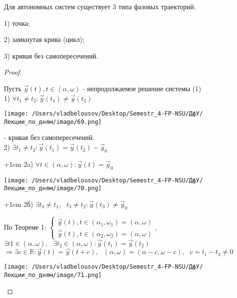 \documentclass[12pt, a4paper]{report}
\begin{document}
\begin{theorem} 
    Для автономных систем существует 3 типа фазовых траекторий: 

    1) точка; 

    2) замкнутая крива (цикл); 

    3) кривая без самопересечений.

\end{theorem}

\begin{proof} \(  \) 

    Пусть \( \vec{y } (t ) , t \in (\alpha , \omega ) \) - непродолжаемое решение системы (1) \\

    1) \( \forall  t_1 \neq  t_2 : \vec{ y} (t_1 ) \neq  \vec{ y} (t_2 ) \) 

    \begin{center}
        \texttt{[image: /Users/vladbelousov/Desktop/Semestr\_4-FP-NSU/ДфУ/Лекции\_по\_дням/image/69.png]}
    \end{center}
    - кривая без самопересечений. \\

    2) \( \exists  t_1 \neq  t_2 : \vec{ y } (t_1 ) = \vec{ y } (t_2 ) - \vec{ y}_0 \) 

    \kern+1cm 2a) \( \forall  t  \in  (\alpha , \omega ) : \vec{ y }  (t ) = \vec{ y} _0 \) 

    \begin{center}
        \texttt{[image: /Users/vladbelousov/Desktop/Semestr\_4-FP-NSU/ДфУ/Лекции\_по\_дням/image/70.png]}
    \end{center}

    \kern+1cm 2б) \( \exists  t_3 \neq  t_1 , \text{  } t_3 \neq  t_2 : \vec{ y}  (t_3 ) \neq  \vec{ y} _0 \) 

    По Теореме 1: \( \begin{cases}
    \vec{ y}  (t ) , t \in (\alpha_1 , \omega_1 ) = (\alpha , \omega ) \\
    \vec{y } (t ) , t \in  (\alpha_2 , \omega_2 ) = (\alpha , \omega)
    \end{cases} \), \( \exists  t 1 \in (\alpha  ,\omega ) , \text{ }  \exists t_2 \in  (\alpha, \omega ) : \vec{ y } (t_1 ) =\vec{ y}  (t_2 ) \) \\

    \( \Rightarrow \exists  c \in  \mathbb{R} : \vec{ y}  (t ) = \vec{ y}  (t  + c ), \text{ }  (\alpha , \omega ) = (\alpha -c , \omega - c ), \text{ }  c = t_1 -t_2 \neq  0  \)     

    \begin{center}
        \texttt{[image: /Users/vladbelousov/Desktop/Semestr\_4-FP-NSU/ДфУ/Лекции\_по\_дням/image/71.png]}
    \end{center}

\end{proof}
\end{document}
